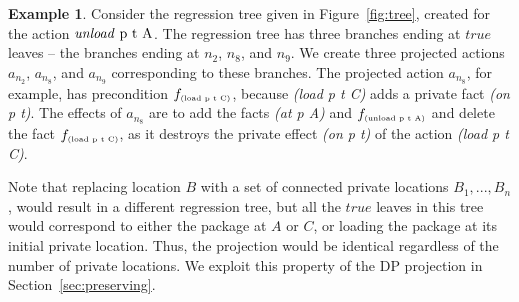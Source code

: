 \documentclass[letterpaper]{article}
\newcommand{\delete}{\textit{delete}}
\newcommand{\true}{\textit{true}}
\newcommand{\load}{\textit{load}}
\newcommand{\unload}{\textit{unload}}
\theoremstyle{definition}
\newtheorem{example}{Example}[section]
\begin{document}
\begin{example}
\label{ex2}
Consider the regression tree given in Figure~\ref{fig:tree}, created for the action $\mbox{\unload\ p t A}$. The regression tree has three branches ending at $\true$ leaves -- the branches ending at $n_2$, $n_8$, and $n_9$. We create three projected actions $a_{n_2}$, $a_{n_8}$, and $a_{n_9}$ corresponding to these branches. 
The projected action $a_{n_8}$, for example, has precondition {\em $f_{\tiny\mbox{(load p t C)}}$}, because {\em (load p t C)} adds a private fact {\em (on p t)}. The effects of $a_{n_8}$ are to add the facts {\em (at p A)} and $f_{\tiny\mbox{(unload p t A)}}$ and delete the fact $f_{\tiny\mbox{(load p t C)}}$, as it destroys the private effect {\em (on p t)} of the action {\em (load p t C)}.




Note that replacing location $B$ with a set of connected private locations $B_1,...,B_n$, would result in a different regression tree, but all the $\true$ leaves in this tree would correspond to either the package at $A$ or $C$, or loading the package at its initial private location. Thus, the projection would be identical regardless of the number of private locations. We exploit this property of the DP projection in Section~\ref{sec:preserving}. %
\end{example}

\end{document}
